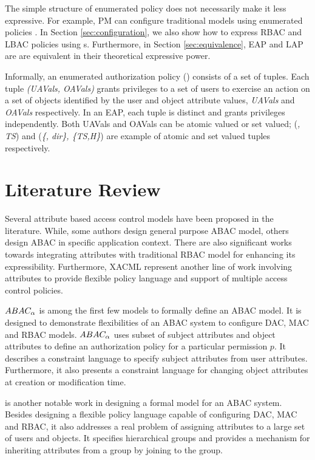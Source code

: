 	The simple structure of enumerated policy does not necessarily make it less expressive. For example, PM can configure traditional models using enumerated policies \cite{INCITS526}. In Section \ref{sec:configuration}, we also show how to express RBAC \cite{rbac} and LBAC \cite{lbac} policies using \EAP{}s. Furthermore, in Section \ref{sec:equivalence}, EAP and LAP are are equivalent in their theoretical expressive power.
	
	Informally, an enumerated authorization policy (\EAP{}) consists of a set of  tuples.  Each tuple \textit{(UAVals, OAVals)} grants privileges to a set of users  to exercise an action on a set of objects identified by the user and object attribute values, \textit{UAVals} and \textit{OAVals} respectively. In an EAP, each tuple is distinct and grants privileges independently. Both  UAVals{} and OAVals{} can be atomic valued or set valued; (\textit{\manager, TS}) and (\textit{\{\manager, dir\}, \{TS,H\}}) are example of atomic and set valued tuples respectively. 
	
	




\section{Literature Review}


Several attribute based access control models have been proposed in the literature. While, some authors design general purpose ABAC model, others design ABAC in specific application context. There are also significant works towards integrating attributes with traditional RBAC model for enhancing its expressibility. Furthermore, XACML represent another line of work involving attributes to provide flexible policy language and support of multiple access control policies.

$ABAC_\alpha${} \cite{abacAlpha} is among the first few models to formally define an ABAC model. It is designed to demonstrate flexibilities of an ABAC system to configure DAC, MAC and RBAC models. $ABAC_\alpha${} uses subset of subject attributes and object attributes to define  an authorization policy for a particular permission $p$. It describes a constraint language to specify subject attributes from user attributes. Furthermore, it also presents a constraint language for changing object attributes at  creation or modification time.

\hgabac{} \cite{hgabac} is another notable work in designing a formal model for an ABAC system. Besides designing a flexible policy language capable of  configuring DAC, MAC and RBAC, it also addresses a real problem of assigning attributes to a large set of users and objects. It specifies hierarchical groups and provides a mechanism for inheriting attributes from a group by joining to the group.

